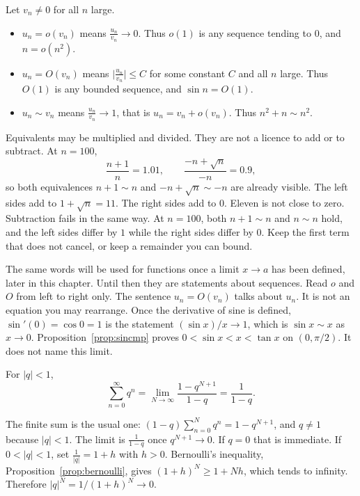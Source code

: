 \begin{definitionx}\label{sym:asymptotic}
Let $v_n\ne0$ for all $n$ large.
\begin{itemize}
\item $u_n=o(v_n)$ means $\frac{u_n}{v_n}\to0$. Thus $o(1)$ is any sequence tending to $0$, and $n=o(n^2)$.
\item $u_n=O(v_n)$ means $\bigl|\frac{u_n}{v_n}\bigr|\le C$ for some constant $C$ and all $n$ large. Thus $O(1)$ is any bounded sequence, and $\sin n=O(1)$.
\item $u_n\sim v_n$ means $\frac{u_n}{v_n}\to1$, that is $u_n=v_n+o(v_n)$. Thus $n^2+n\sim n^2$.
\end{itemize}
\end{definitionx}

Equivalents may be multiplied and divided. They are not a licence to add or to subtract. At $n=100$,
\[
\frac{n+1}n=1.01,\qquad\frac{-n+\sqrt n}{-n}=0.9,
\]
so both equivalences $n+1\sim n$ and $-n+\sqrt n\sim-n$ are already visible. The left sides add to $1+\sqrt n=11$. The right sides add to $0$. Eleven is not close to zero. Subtraction fails in the same way. At $n=100$, both $n+1\sim n$ and $n\sim n$ hold, and the left sides differ by $1$ while the right sides differ by $0$. Keep the first term that does not cancel, or keep a remainder you can bound.

The same words will be used for functions once a limit $x\to a$ has been defined, later in this chapter. Until then they are statements about sequences. Read $o$ and $O$ from left to right only. The sentence $u_n=O(v_n)$ talks about $u_n$. It is not an equation you may rearrange. Once the derivative of sine is defined, $\sin'(0)=\cos 0=1$ is the statement $(\sin x)/x\to 1$, which is $\sin x\sim x$ as $x\to 0$. Proposition~\ref{prop:sincmp} proves $0<\sin x<x<\tan x$ on $(0,\pi/2)$. It does not name this limit.

\begin{examplex}
For $|q|<1$,
\[
\sum_{n=0}^\infty q^n=\lim_{N\to\infty}\frac{1-q^{N+1}}{1-q}=\frac1{1-q}.
\]
\end{examplex}

The finite sum is the usual one: $(1-q)\sum_{n=0}^N q^n=1-q^{N+1}$, and $q\ne1$ because $|q|<1$. The limit is $\frac1{1-q}$ once $q^{N+1}\to0$. If $q=0$ that is immediate. If $0<|q|<1$, set $\frac1{|q|}=1+h$ with $h>0$. Bernoulli's inequality, Proposition~\ref{prop:bernoulli}, gives $(1+h)^N\ge1+Nh$, which tends to infinity. Therefore $|q|^N=1/(1+h)^N\to0$.

